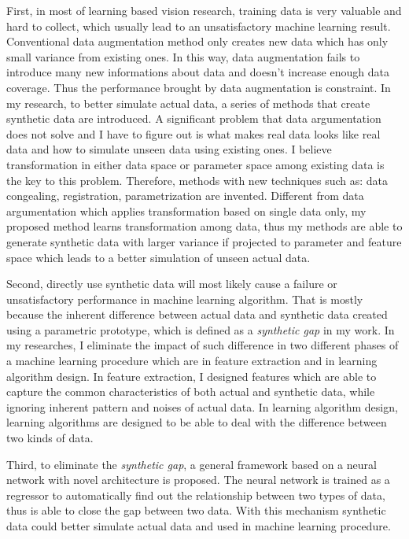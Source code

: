 \documentclass{iitthesis}
\begin{document}
First, in most of learning based vision research, training data is very valuable and hard to collect, which usually lead to an unsatisfactory machine learning result. Conventional data augmentation method only creates
new data which has only small variance from existing ones. In this way, data augmentation fails to introduce many new informations about data and doesn't increase enough data coverage. Thus the performance brought by data augmentation is constraint. In my research, to better simulate actual data, a series of methods that create synthetic data are introduced. A significant problem that data argumentation does not solve and I have to figure out is what makes real data looks like real data and how to simulate unseen data using existing ones. I believe transformation in either data space or parameter space among existing data is the key to this problem. Therefore, methods with new techniques such as: data congealing, registration, parametrization
are invented. Different from data argumentation which applies transformation based on single data only, my proposed method learns transformation among data, thus my methods are able to generate synthetic data with larger variance if projected to parameter and feature space which leads to a better simulation of unseen actual data.

Second, directly use synthetic data will most likely cause a failure or unsatisfactory performance in machine learning algorithm. That is mostly because the inherent difference between actual data and synthetic data created using a parametric prototype, which is defined as a \textit{synthetic gap} in my work. In my researches, I eliminate the impact of such difference in two different phases of a machine learning procedure which are in feature extraction and in learning algorithm design. In feature extraction, I designed features which are able to capture the common characteristics of both actual and synthetic data, while ignoring inherent pattern and noises of actual data. In learning algorithm design, learning algorithms are designed to be able to deal with the difference between two kinds of data. 

Third, to eliminate the \textit{synthetic gap}, a general framework based on a neural network with novel architecture is proposed. The neural network is trained as a regressor to automatically find out the relationship between two types of data, thus is able to close the gap between two data. With this mechanism synthetic data could better simulate actual data and used in machine learning procedure.
\end{document}
